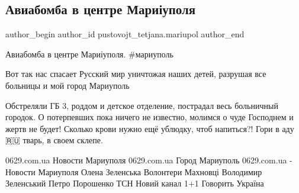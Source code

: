  
 
 
 
 

\subsection{Авиабомба в центре Мариіуполя}
\label{sec:09_03_2022.fb.pustovojt_tetjana.mariupol.1.aviabomba_v_tsentre_}

\ifcmt
 author_begin
   author_id pustovojt_tetjana.mariupol
 author_end
\fi

Авиабомба в центре Мариіуполя. \#мариуполь

Вот так нас спасает Русский мир уничтожая наших детей, разрушая все больницы и
мой город Мариуполь

Обстреляли ГБ 3, роддом и детское отделение, пострадал весь больничный городок.
О потерпевших пока ничего не известно, молимся о чуде Господнем и жертв не
будет! Сколько крови нужно ещё ублюдку, чтоб напиться?! Гори в аду 🇷🇺 тварь,
в своем склепе. 

0629.com.ua Новости Мариуполя 0629.com.ua Город Мариуполь 0629.com.ua - Новости
Мариуполя Олена Зеленська Волонтери Махновці Володимир Зеленський Петро
Порошенко ТСН Новий канал 1+1 Говорить Україна

